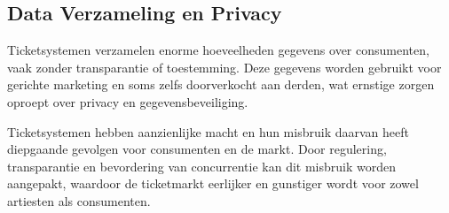 \subsection{Data Verzameling en Privacy}

Ticketsystemen verzamelen enorme hoeveelheden gegevens over consumenten, 
vaak zonder transparantie of toestemming. 
Deze gegevens worden gebruikt voor gerichte marketing en soms zelfs doorverkocht aan derden, 
wat ernstige zorgen oproept over privacy en gegevensbeveiliging.

\vspace{10 mm}

Ticketsystemen hebben aanzienlijke macht en hun misbruik daarvan heeft diepgaande gevolgen voor consumenten en de markt. 
Door regulering, 
transparantie en bevordering van concurrentie kan dit misbruik worden aangepakt, 
waardoor de ticketmarkt eerlijker en gunstiger wordt voor zowel artiesten als consumenten.

\cite{Similarweb, Wikimedia, Investopedia}